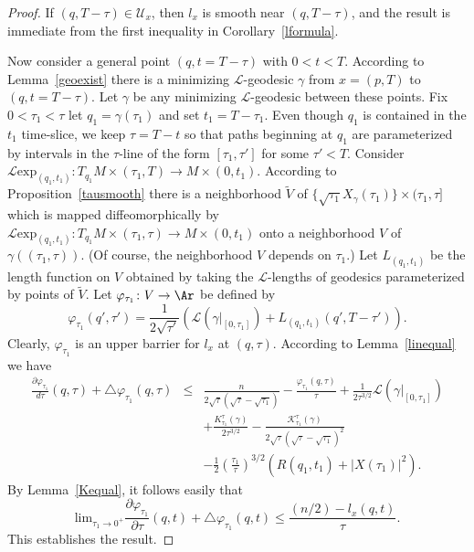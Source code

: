 \begin{proof}\sketch
{}
If $(q,T-\tau)\in {\mathcal U}_{x}$, then $l_x$ is smooth near $(q,T-\tau)$,
and the result is immediate from the first inequality in
Corollary~\ref{lformula}.


Now consider a general point $(q,t=T-\tau)$ with $0<t<T$. According to
Lemma~\ref{geoexist} there is  a minimizing ${\mathcal L}$-geodesic $\gamma$
from $x=(p,T)$ to $(q,t=T-\tau)$. Let $\gamma$ be any minimizing ${\mathcal
L}$-geodesic between these points. Fix $0<\tau_1<\tau$ let $q_1=\gamma(\tau_1)$
and set $t_1=T-\tau_1$. Even though $q_1$ is contained in the $t_1$ time-slice,
we keep $\tau=T-t$ so that paths beginning at $q_1$ are parameterized by
intervals in the $\tau$-line of the form $[\tau_1,\tau']$ for some $\tau'<T$.
Consider ${\mathcal L}\mathrm{exp}_{(q_1,t_1)}\colon T_{q_1}M\times (\tau_1,T)\to
M\times (0,t_1)$. According to Proposition~\ref{tausmooth} there is a
neighborhood $\widetilde V$ of $\{\sqrt{\tau_1}X_\gamma(\tau_1)\}\times
(\tau_1,\tau]$ which is mapped diffeomorphically  by ${\mathcal L}\mathrm{exp}_{(q_1,t_1)}\colon T_{q_1}M\times (\tau_1,\tau)\to M\times (0,t_1)$ onto a
neighborhood $V$ of $\gamma((\tau_1,\tau))$. (Of course, the neighborhood $V$
depends on $\tau_1$.) Let $L_{(q_1,t_1)}$ be the length function on $V$
obtained by taking the ${\mathcal L}$-lengths of geodesics parameterized by
points of $\widetilde V$. Let $\varphi_{\tau_1}\colon V\to \Ar$ be defined by
$$\varphi_{\tau_1}(q',\tau')=\frac{1}{2\sqrt{\tau'}}\left({\mathcal
L}(\gamma|_{[0,\tau_1]})+L_{(q_1,t_1)}(q',T-\tau')\right).$$
Clearly, $\varphi_{\tau_1}$ is an upper barrier for $l_x$ at
$(q,\tau)$. According to Lemma~\ref{linequal} we have
\begin{eqnarray*}
\frac{\partial \varphi_{\tau_1}}{d\tau}(q,\tau)+\triangle
\varphi_{\tau_1}(q,\tau) & \le &
\frac{n}{2\sqrt{\tau}(\sqrt{\tau}-\sqrt{\tau_1})}-\frac{\varphi_{\tau_1}(q,\tau)}{\tau}
+\frac{1}{2\tau^{3/2}}{\mathcal L}(\gamma|_{[0,\tau_1]})\\
& & +\frac{K^{\tau}_{\tau_1}(\gamma)}{2\tau^{3/2}}-\frac{{\mathcal
K}_{\tau_1}^{\tau}(\gamma)}{2\sqrt{\tau}(\sqrt{\tau}-\sqrt{\tau_1})^{2}}
\\ & & -\frac{1}{2}\left(\frac{\tau_1}{\tau}\right)^{3/2}\left(R(q_1,t_1)+|X(\tau_1)|^2\right).
\end{eqnarray*}
By Lemma~\ref{Kequal},  it follows easily that
$$\mathrm{lim}_{\tau_1\rightarrow 0^+}
\frac{\partial \varphi_{\tau_1}}{\partial \tau}(q,t)+\triangle
\varphi_{\tau_1}(q,t)\le \frac{(n/2)-l_x(q,t)}{\tau}.$$ This
establishes the result.
\end{proof}

